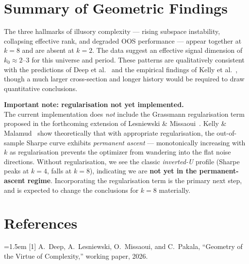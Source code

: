 \documentclass[11pt, a4paper]{article}
\begin{document}
\section{Summary of Geometric Findings}

The three hallmarks of illusory complexity --- rising subspace instability, collapsing effective rank, and degraded OOS performance --- appear together at $k=8$ and are absent at $k=2$. The data suggest an effective signal dimension of $k_0 \approx 2$--$3$ for this universe and period. These patterns are qualitatively consistent with the predictions of Deep et al.~\cite{DLMP2026} and the empirical findings of Kelly et al.~\cite{KMZ2024}, though a much larger cross-section and longer history would be required to draw quantitative conclusions.

\vspace{6pt}
\begin{notebox}
\textbf{Important note: regularisation not yet implemented.}\\[4pt]
The current implementation does \emph{not} include the Grassmann regularisation term proposed in the forthcoming extension of Lesniewski \& Missaoui~\cite{LM2026}.
Kelly \& Malamud~\cite{KM2025} show theoretically that with appropriate regularisation, the out-of-sample Sharpe curve exhibits \emph{permanent ascent} --- monotonically increasing with $k$ as regularisation prevents the optimizer from wandering into the flat noise directions.
Without regularisation, we see the classic \emph{inverted-U} profile (Sharpe peaks at $k=4$, falls at $k=8$), indicating we are \textbf{not yet in the permanent-ascent regime}.
Incorporating the regularisation term is the primary next step, and is expected to change the conclusions for $k=8$ materially.
\end{notebox}

\section*{References}
\begingroup
\small
\setlength{\parskip}{3pt}

\noindent\hangindent=1.5em
[1]\label{DLMP2026} A.~Deep, A.~Lesniewski, O.~Missaoui, and C.~Pakala,
``Geometry of the Virtue of Complexity,'' working paper, 2026.
\end{document}
